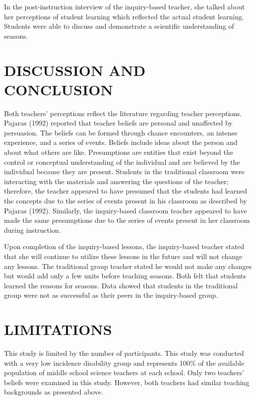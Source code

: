 \documentclass[11.5pt]{sig-alternate} %
\begin{document}
\begin{large}
In the post-instruction interview of the inquiry-based teacher, she talked about her perceptions of student learning which reflected the actual student learning. Students were able to discuss and demonstrate a scientific understanding of seasons.

\section*{DISCUSSION AND CONCLUSION}

Both teachers’ perceptions reflect the literature regarding teacher perceptions. Pajaras (1992) reported that teacher beliefs are personal and unaffected by persuasion.  The beliefs can be formed through chance encounters, an intense experience, and a series of events.  Beliefs include ideas about the person and about what others are like.  Presumptions are entities that exist beyond the control or conceptual understanding of the individual and are believed by the individual because they are present. Students in the traditional classroom were interacting with the materials and answering the questions of the teacher; therefore, the teacher appeared to have presumed that the students had learned the concepts due to the series of events present in his classroom as described by Pajaras (1992).  Similarly, the inquiry-based classroom teacher appeared to have made the same presumptions due to the series of events present in her classroom during instruction.

Upon completion of the inquiry-based lessons, the inquiry-based teacher stated that she will continue to utilize these lessons in the future and will not change any lessons. The traditional group teacher stated he would not make any changes but would add only a few units before teaching seasons. Both felt that students learned the reasons for seasons. Data showed that students in the traditional group were not as successful as their peers in the inquiry-based group.

\section*{LIMITATIONS}
 
 This study is limited by the number of participants.  This study was conducted with a very low incidence disability group and represents 100\% of the available population of middle school science teachers at each school.  Only two teachers’ beliefs were examined in this study.  However, both teachers had similar teaching backgrounds as presented above.  


\end{large}
\end{document}
